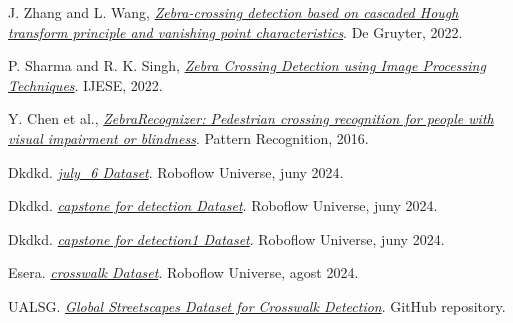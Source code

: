 \documentclass[10pt,a4paper,twocolumn,twoside]{article}
\begin{document}
\begin{thebibliography}{9}
	J. Zhang and L. Wang, \textit{\href{https://www.degruyterbrill.com/document/doi/10.1515/comp-2022-0260/html}{Zebra-crossing detection based on cascaded Hough transform principle and vanishing point characteristics}}. De Gruyter, 2022.
	
	P. Sharma and R. K. Singh, \textit{\href{https://www.ijese.org/wp-content/uploads/Papers/v13i3/B104214020125.pdf}{Zebra Crossing Detection using Image Processing Techniques}}. IJESE, 2022.
	
	Y. Chen et al., \textit{\href{https://www.sciencedirect.com/science/article/abs/pii/S0031320316300826}{ZebraRecognizer: Pedestrian crossing recognition for people with visual impairment or blindness}}. Pattern Recognition, 2016.
	
	
	Dkdkd. \href{https://universe.roboflow.com/dkdkd/july_6}{\textit{july\_6 Dataset}}. Roboflow Universe, juny 2024.
	
	Dkdkd. \href{https://universe.roboflow.com/dkdkd/capstone-for-detection}{\textit{capstone for detection Dataset}}. Roboflow Universe, juny 2024.
	
	Dkdkd. \href{https://universe.roboflow.com/dkdkd/capstone-for-detection1}{\textit{capstone for detection1 Dataset}}. Roboflow Universe, juny 2024.
	
	Esera. \href{https://universe.roboflow.com/esera/crosswalk-cz3sx}{\textit{crosswalk Dataset}}. Roboflow Universe, agost 2024.
	
	UALSG. \href{https://github.com/ualsg/global-streetscapes}{\textit{Global Streetscapes Dataset for Crosswalk Detection}}. GitHub repository.
	
	
	
\end{thebibliography}
\end{document}

